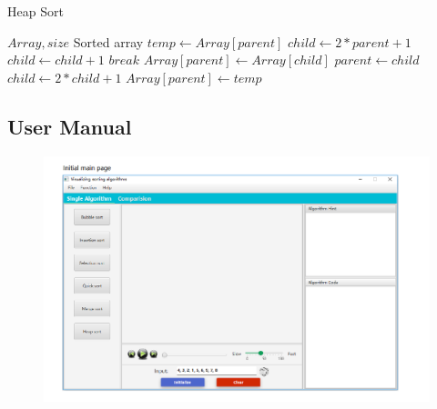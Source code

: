 \documentclass[paper=a4, fontsize=11pt,twoside]{scrartcl}		%
\begin{document}
\renewcommand{\algorithmicrequire}{\textbf{Input:}}
\renewcommand{\algorithmicensure}{\textbf{Output:}}
    \begin{algorithm}
        \caption{Heap Sort}
        \begin{algorithmic}[1] 
            \Require $Array,size$
            \Ensure Sorted array
                   \State \Call{HEAPIFY}{$Array,i,size-1]$}
                \EndFor
                   \State \Call{Swap}{$Array[i],Array[0]]$}
                   	\State \Call{HEAPIFY}{$Array,0,i]$}
                \EndFor
            \EndFunction
            \State
                \State $temp \gets Array[parent]$
                \State $child\gets 2*parent+1$
      				\State $child \gets child+1$
              \EndIf
      					\State $break$
               \EndIf
                \State $Array[parent] \gets Array[child]$
                \State $parent\gets child$
                \State $child\gets 2*child+1$
                \EndWhile
                \State $Array[parent] \gets temp$
            \EndFunction
        \end{algorithmic}
    \end{algorithm}

\subsection{User Manual}
\begin{figure}[htbp]
\centering
\includegraphics[width=1\textwidth]{user_menu/1.png}
\label{user_menu1}
\end{figure}
\end{document}
